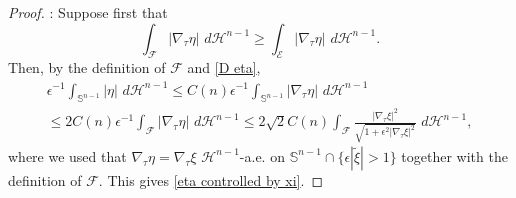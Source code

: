 \documentclass[10pt,a4paper]{amsart}
\def\ez{\epsilon}
\begin{document}
\begin{proof}
\medskip
{}:
Suppose first that
\begin{equation}\label{F large}
\int_{\mathcal F}  |\nabla_\tau \eta| \, \,d\mathscr H^{n-1}\ge \int_{\mathcal E}  |\nabla_\tau \eta| \, \,d\mathscr H^{n-1}.
\end{equation}
Then, by the definition of $\mathcal F$ and \eqref{D eta},
\begin{multline}\label{control 1}
\ez^{-1}\int_{\mathbb S^{n-1}} |\eta|  \, \,d\mathscr H^{n-1}  \leq  C(n) \ez^{-1} \int_{\mathbb S^{n-1} }  |\nabla_\tau \eta| \, \,d\mathscr H^{n-1}\\
\leq  2C(n) \ez^{-1} \int_{\mathcal F}  |\nabla_\tau \eta| \, \,d\mathscr H^{n-1}\le 2\sqrt{2} C(n)  \int_{\mathcal F} \frac{|\nabla_\tau  \xi|^2}{\sqrt{1+\ez^2|\nabla_\tau \xi|^2}} \, \,d\mathscr H^{n-1},
    \end{multline}
where we used that $\nabla_\tau\eta=\nabla_\tau  \xi$ $\mathscr H^{n-1}$-a.e. on $\mathbb S^{n-1}\cap \{\ez|\tilde\xi|>  1\}$ together with the definition of $\mathcal F$.
This gives \eqref{eta controlled by xi}.


\end{proof}
\end{document}
